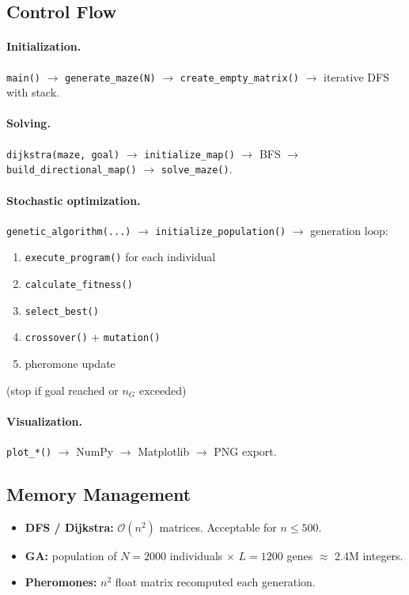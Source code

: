 \documentclass[12pt, a4paper]{article}
\theoremstyle{definition}
\newcommand{\bigO}[1]{\mathcal{O}\!\left(#1\right)}
\newcommand{\code}[1]{\texttt{#1}}
\begin{document}
\subsection{Control Flow}

\paragraph{Initialization.}
\code{main()} $\to$ \code{generate\_maze(N)} $\to$
\code{create\_empty\_matrix()} $\to$ iterative DFS with stack.

\paragraph{Solving.}
\code{dijkstra(maze, goal)} $\to$ \code{initialize\_map()} $\to$
BFS $\to$ \code{build\_directional\_map()} $\to$ \code{solve\_maze()}.

\paragraph{Stochastic optimization.}
\code{genetic\_algorithm(...)} $\to$ \code{initialize\_population()} $\to$
generation loop:
\begin{enumerate}[noitemsep]
    \item \code{execute\_program()} for each individual
    \item \code{calculate\_fitness()}
    \item \code{select\_best()}
    \item \code{crossover()} + \code{mutation()}
    \item pheromone update
\end{enumerate}
(stop if goal reached or $n_G$ exceeded)

\paragraph{Visualization.}
\code{plot\_*()} $\to$ NumPy $\to$ Matplotlib $\to$ PNG export.

\subsection{Memory Management}

\begin{itemize}
    \item \textbf{DFS / Dijkstra:} $\bigO{n^2}$ matrices. Acceptable for $n \leq 500$.
    \item \textbf{GA:} population of $N = 2000$ individuals $\times$ $L = 1200$ genes
          $\approx$ 2.4M integers.
    \item \textbf{Pheromones:} $n^2$ float matrix recomputed each generation.
\end{itemize}
\end{document}
